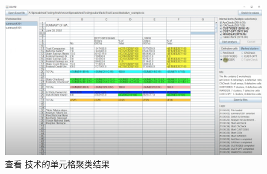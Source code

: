 \begin{figure}[tbp]    
    \centering
    \includegraphics[width=\textwidth]{figure/sg/sguard-6.png}
    \caption{查看 \wa 技术的单元格聚类结果}
    \label{figure-sg6}
\end{figure}